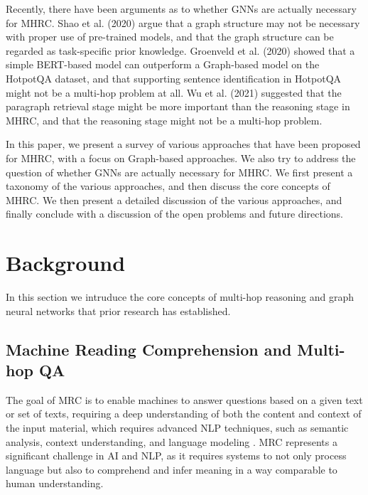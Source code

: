 \documentclass[sigplan,screen]{acmart}
\begin{document}
Recently, there have been arguments as to whether GNNs are actually necessary for MHRC. Shao et al. (2020) \cite{RN127} argue that 
a graph structure may not be necessary with proper use of pre-trained models, and that the graph structure can be regarded as task-specific 
prior knowledge. Groenveld et al. (2020) \cite{RN126} showed that a simple BERT-based model can outperform a Graph-based model on the HotpotQA dataset,
and that supporting sentence identification in HotpotQA might not be a multi-hop problem at all. Wu et al. (2021) \cite{RN106} suggested that
the paragraph retrieval stage might be more important than the reasoning stage in MHRC, and that the reasoning stage might not be a multi-hop problem.

In this paper, we present a survey of various approaches that have been proposed for MHRC, with a focus on Graph-based approaches. We also try to
address the question of whether GNNs are actually necessary for MHRC. We first present a taxonomy of the various approaches, and then discuss the
core concepts of MHRC. We then present a detailed discussion of the various approaches, and finally conclude with a discussion of the open problems 
and future directions.

\section{Background}
In this section we intruduce the core concepts of multi-hop reasoning and graph neural networks that prior research has established.  

\subsection{Machine Reading Comprehension and Multi-hop QA}
The goal of MRC is to enable machines to answer questions based on a given text or set of texts, requiring a deep understanding of both the content and context of the input material, which 
requires advanced NLP techniques, such as semantic analysis, context understanding, and language modeling \cite{RN208}. MRC represents a significant challenge in AI and NLP, as it requires systems to not only process language but also to comprehend and infer meaning in a way comparable to human understanding.
\end{document}
